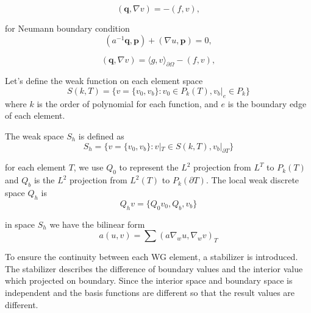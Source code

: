 \begin{equation}
(\mathbf{q}, \nabla v) = -(f, v),
\end{equation}

for Neumann boundary condition
\begin{equation}
(a^{-1} \mathbf{q}, \mathbf{p}) + (\nabla u, \mathbf{p}) = 0,
\end{equation}

\begin{equation}
(\mathbf{q}, \nabla v) = \langle g, v \rangle_{\partial \Omega} - (f, v),
\end{equation}

Let's define the weak function on each element space
\begin{equation}
S(k, T) = \{ v = \{ v_{0}, v_{b} \} : v_{0} \in P_{k} (T), v_{b}|_{e} \in P_{k} \}
\end{equation}
where $ k $ is the order of polynomial for each function, and $ e $ is the boundary edge of each element.

The weak space $ S_{h} $ is defined as
\begin{equation}
S_{h} = \{ v = \{ v_{0}, v_{b} \} : v |_{T} \in S(k, T), v_{b} |_{\partial T} \}
\end{equation}

for each element $ T $, we use $ Q_{0} $ to represent the $ L^{2} $ projection from $ L^{T} $ to $ P_{k}(T) $ and $ Q_{b} $ is the $ L^{2} $ projection from $ L^{2}(T) $ to $ P_{k}(\partial T) $. The local weak discrete space $ Q_{h} $ is
\begin{equation}
Q_{h} v = \{ Q_{0} v_{0}, Q_{b}, v_{b} \}
\end{equation}

in space $ S_{h} $ we have the bilinear form
\begin{equation}
a(u, v) = \sum (a \nabla_{w} u, \nabla_{w} v)_{T}
\end{equation}

To ensure the continuity between each WG element, a stabilizer is introduced. The stabilizer describes the difference of boundary values and the interior value which projected on boundary. Since the interior space and boundary space is independent and the basis functions are different so that the result values are different. 


